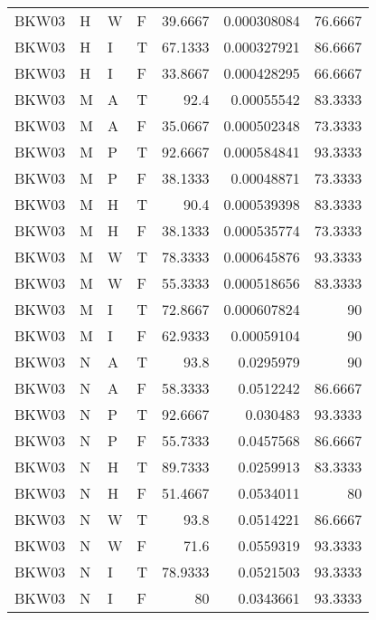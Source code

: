 \begin{table}[htb!]
{\begin{tabular}{llllrrr}
            BKW03    & H     & W     & F          & 39.6667    & 0.000308084 & 76.6667  \\
            BKW03    & H     & I     & T          & 67.1333    & 0.000327921 & 86.6667  \\
            BKW03    & H     & I     & F          & 33.8667    & 0.000428295 & 66.6667  \\
            BKW03    & M     & A     & T          & 92.4       & 0.00055542  & 83.3333  \\
            BKW03    & M     & A     & F          & 35.0667    & 0.000502348 & 73.3333  \\
            BKW03    & M     & P     & T          & 92.6667    & 0.000584841 & 93.3333  \\
            BKW03    & M     & P     & F          & 38.1333    & 0.00048871  & 73.3333  \\
            BKW03    & M     & H     & T          & 90.4       & 0.000539398 & 83.3333  \\
            BKW03    & M     & H     & F          & 38.1333    & 0.000535774 & 73.3333  \\
            BKW03    & M     & W     & T          & 78.3333    & 0.000645876 & 93.3333  \\
            BKW03    & M     & W     & F          & 55.3333    & 0.000518656 & 83.3333  \\
            BKW03    & M     & I     & T          & 72.8667    & 0.000607824 & 90       \\
            BKW03    & M     & I     & F          & 62.9333    & 0.00059104  & 90       \\
            BKW03    & N     & A     & T          & 93.8       & 0.0295979   & 90       \\
            BKW03    & N     & A     & F          & 58.3333    & 0.0512242   & 86.6667  \\
            BKW03    & N     & P     & T          & 92.6667    & 0.030483    & 93.3333  \\
            BKW03    & N     & P     & F          & 55.7333    & 0.0457568   & 86.6667  \\
            BKW03    & N     & H     & T          & 89.7333    & 0.0259913   & 83.3333  \\
            BKW03    & N     & H     & F          & 51.4667    & 0.0534011   & 80       \\
            BKW03    & N     & W     & T          & 93.8       & 0.0514221   & 86.6667  \\
            BKW03    & N     & W     & F          & 71.6       & 0.0559319   & 93.3333  \\
            BKW03    & N     & I     & T          & 78.9333    & 0.0521503   & 93.3333  \\
            BKW03    & N     & I     & F          & 80         & 0.0343661   & 93.3333  \\
            \hline
        \end{tabular}
    }{
    }
\end{table} 
